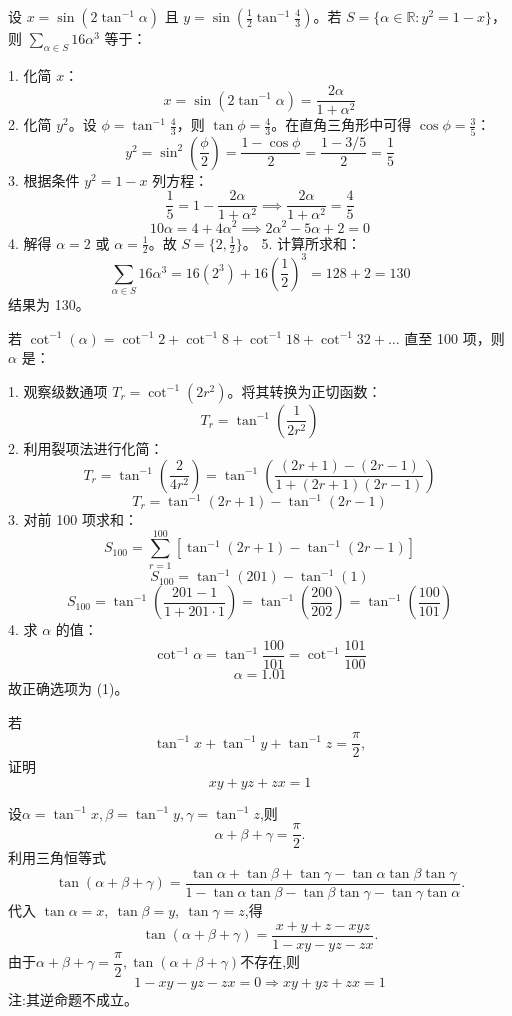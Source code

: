 \begin{questions}
\question
设 $x = \sin(2\tan^{-1} \alpha)$ 且 $y = \sin\left(\frac{1}{2}\tan^{-1} \frac{4}{3}\right)$。若 $S = \{\alpha \in \mathbb{R} : y^2 = 1-x\}$，则 $\sum_{\alpha \in S} 16\alpha^3$ 等于：

\begin{solution}
1. 化简 $x$：
\[
x = \sin(2\tan^{-1} \alpha) = \frac{2\alpha}{1+\alpha^2}
\]
2. 化简 $y^2$。设 $\phi = \tan^{-1} \frac{4}{3}$，则 $\tan \phi = \frac{4}{3}$。在直角三角形中可得 $\cos \phi = \frac{3}{5}$：
\[
y^2 = \sin^2 \left(\frac{\phi}{2}\right) = \frac{1 - \cos \phi}{2} = \frac{1 - 3/5}{2} = \frac{1}{5}
\]
3. 根据条件 $y^2 = 1-x$ 列方程：
\[
\frac{1}{5} = 1 - \frac{2\alpha}{1+\alpha^2} \implies \frac{2\alpha}{1+\alpha^2} = \frac{4}{5}
\]
\[
10\alpha = 4 + 4\alpha^2 \implies 2\alpha^2 - 5\alpha + 2 = 0
\]
4. 解得 $\alpha = 2$ 或 $\alpha = \frac{1}{2}$。故 $S = \{2, \frac{1}{2}\}$。
5. 计算所求和：
\[
\sum_{\alpha \in S} 16\alpha^3 = 16(2^3) + 16\left(\frac{1}{2}\right)^3 = 128 + 2 = 130
\]
结果为 130。
\end{solution}

\question
若 $\cot^{-1}(\alpha) = \cot^{-1} 2 + \cot^{-1} 8 + \cot^{-1} 18 + \cot^{-1} 32 + \dots$ 直至 100 项，则 $\alpha$ 是：

\begin{solution}
1. 观察级数通项 $T_r = \cot^{-1}(2r^2)$。将其转换为正切函数：
\[
T_r = \tan^{-1}\left(\frac{1}{2r^2}\right)
\]
2. 利用裂项法进行化简：
\[
T_r = \tan^{-1}\left(\frac{2}{4r^2}\right) = \tan^{-1}\left(\frac{(2r+1) - (2r-1)}{1 + (2r+1)(2r-1)}\right)
\]
\[
T_r = \tan^{-1}(2r+1) - \tan^{-1}(2r-1)
\]
3. 对前 100 项求和：
\[
S_{100} = \sum_{r=1}^{100} [\tan^{-1}(2r+1) - \tan^{-1}(2r-1)]
\]
\[
S_{100} = \tan^{-1}(201) - \tan^{-1}(1)
\]
\[
S_{100} = \tan^{-1}\left(\frac{201 - 1}{1 + 201 \cdot 1}\right) = \tan^{-1}\left(\frac{200}{202}\right) = \tan^{-1}\left(\frac{100}{101}\right)
\]
4. 求 $\alpha$ 的值：
\[
\cot^{-1} \alpha = \tan^{-1} \frac{100}{101} = \cot^{-1} \frac{101}{100}
\]
\[
\alpha = 1.01
\]
故正确选项为 (1)。
\end{solution}
    \question 若 
    \[
    \tan^{-1} x + \tan^{-1} y + \tan^{-1} z = \frac{\pi}{2},
    \] 
    证明 
    \[
    xy + yz + zx = 1
    \]
    \begin{solution}
        设$\alpha = \tan^{-1} x, \beta = \tan^{-1} y, \gamma = \tan^{-1} z$,则
        \[
        \alpha + \beta + \gamma = \frac{\pi}{2}.
        \]
        利用三角恒等式
        \[
        \tan(\alpha+\beta+\gamma)
        =\frac{\tan\alpha + \tan\beta + \tan\gamma - \tan\alpha \tan\beta \tan\gamma}
        {1 - \tan\alpha \tan\beta - \tan\beta \tan\gamma - \tan\gamma \tan\alpha}.
        \]
        代入 $\tan\alpha=x,\ \tan\beta=y,\ \tan\gamma=z$,得
        \[
        \tan(\alpha+\beta+\gamma)
        =\frac{x + y + z - xyz}{1 - xy - yz - zx}.
        \]
        由于$\alpha+\beta+\gamma = \dfrac{\pi}{2},\tan(\alpha+\beta+\gamma)$不存在,则
        \[
        1 - xy - yz - zx = 0 \Rightarrow xy + yz + zx = 1
        \]
        注:其逆命题不成立。
    \end{solution}


\end{questions}
